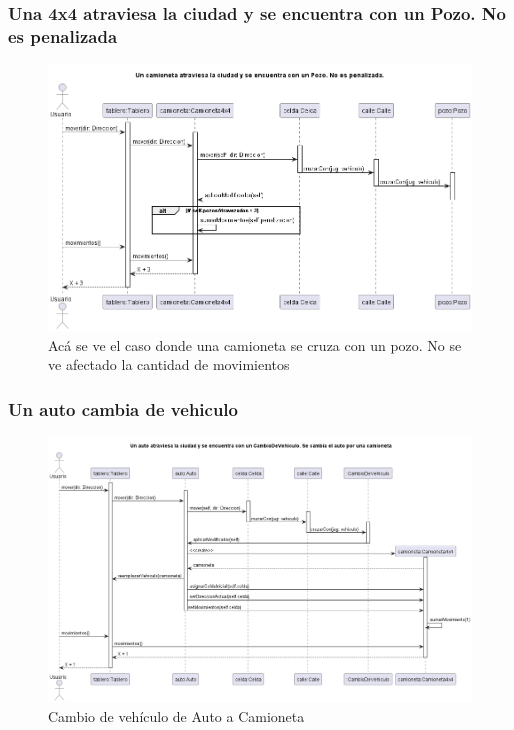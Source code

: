 \documentclass[titlepage,a4paper]{article}
\begin{document}
\subsubsection[Una 4x4 atraviesa la ciudad y se encuentra con un Pozo. No es penalizada]{Una 4x4 atraviesa la ciudad y se encuentra con un Pozo. No es penalizada}

\begin{figure}[H]
  \centering
  \includegraphics[width=1\textwidth]{diagramas/SecuenciaUnaCamionetaCruzaUnPozoYNoEsPenalizado.png}
  \caption{\label{fig:class01} Acá se ve el caso donde una camioneta se cruza con un pozo. No se ve afectado la cantidad de movimientos}
\end{figure}



\subsubsection[Un auto cambia de vehiculo]{Un auto cambia de vehiculo}

\begin{figure}[H]
  \centering
  \includegraphics[width=1\textwidth]{diagramas/SecuenciaAutoCambiaVehiculo.png}
  \caption{\label{fig:class01} Cambio de vehículo de Auto a Camioneta}
\end{figure}
\end{document}
